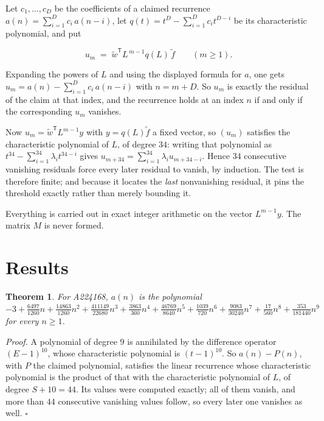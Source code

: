 \documentclass[11pt]{article}
\newtheorem{theorem}{Theorem}
\theoremstyle{definition}
\begin{document}
Let $c_1,\dots,c_D$ be the coefficients of a claimed recurrence $a(n) = \sum_{i=1}^{D} c_i\,a(n-i)$, let $q(t) = t^{D} - \sum_{i=1}^{D} c_i t^{D-i}$ be its characteristic polynomial, and put

\[u_m \;=\; \tilde w^{\mathsf T} L^{\,m-1} q(L)\,\tilde f \qquad (m \ge 1).\]

Expanding the powers of $L$ and using the displayed formula for $a$, one gets $u_m = a(n) - \sum_{i=1}^{D} c_i\,a(n-i)$ with $n = m + D$. So $u_m$ is exactly the residual of the claim at that index, and the recurrence holds at an index $n$ if and only if the corresponding $u_m$ vanishes.

Now $u_m = \tilde w^{\mathsf T} L^{m-1} y$ with $y = q(L)\tilde f$ a fixed vector, so $(u_m)$ satisfies the characteristic polynomial of $L$, of degree $34$: writing that polynomial as $t^{34} - \sum_{i=1}^{34} \lambda_i t^{34-i}$ gives $u_{m+34} = \sum_{i=1}^{34} \lambda_i u_{m+34-i}$. Hence $34$ consecutive vanishing residuals force every later residual to vanish, by induction. The test is therefore finite; and because it locates the {\itshape last} nonvanishing residual, it pins the threshold exactly rather than merely bounding it.

Everything is carried out in exact integer arithmetic on the vector $L^{m-1}y$. The matrix $M$ is never formed.

\section{Results}

\begin{theorem} For A224168, $a(n)$ is the polynomial $-3 + \frac{6497}{1260}n + \frac{14863}{1260}n^{2} + \frac{411149}{22680}n^{3} + \frac{3863}{360}n^{4} + \frac{46769}{8640}n^{5} + \frac{1039}{720}n^{6} + \frac{9083}{30240}n^{7} + \frac{17}{560}n^{8} + \frac{353}{181440}n^{9}$ for every $n \ge 1$.\end{theorem}

{\itshape Proof.} A polynomial of degree $9$ is annihilated by the difference operator $(E-1)^{10}$, whose characteristic polynomial is $(t-1)^{10}$. So $a(n) - P(n)$, with $P$ the claimed polynomial, satisfies the linear recurrence whose characteristic polynomial is the product of that with the characteristic polynomial of $L$, of degree $S + 10 = 44$. Its values were computed exactly; all of them vanish, and more than $44$ consecutive vanishing values follow, so every later one vanishes as well. $\square$
\end{document}
